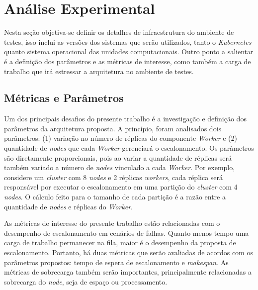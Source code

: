 \chapter{Análise Experimental}
Nesta seção objetiva-se definir os detalhes de infraestrutura do ambiente de testes, isso inclui as versões dos sistemas que serão utilizados, tanto o \textit{Kubernetes} quanto sistema operacional das unidades computacionais. Outro ponto a salientar é a definição dos parâmetros e as métricas de interesse, como também a carga de trabalho que irá estressar a arquitetura no ambiente de testes.

\section{Métricas e Parâmetros}
Um dos principais desafios do presente trabalho é a investigação e definição dos parâmetros da arquitetura proposta. A princípio, foram analisados dois parâmetros: (1) variação no número de réplicas do componente \textit{Worker} e (2) quantidade de \textit{nodes} que cada \textit{Worker} gerenciará o escalonamento. Os parâmetros são diretamente proporcionais, pois ao variar a quantidade de réplicas será também variado a número de \textit{nodes} vinculado a cada \textit{Worker}. Por exemplo, considere um \textit{cluster} com 8 \textit{nodes} e 2 réplicas \textit{workers}, cada réplica será responsável por executar o escalonamento em uma partição do \textit{cluster} com 4 \textit{nodes}. O cálculo feito para o tamanho de cada partição é a razão entre a quantidade de \textit{nodes} e réplicas do \textit{Worker}.


As métricas de interesse do presente trabalho estão relacionadas com o desempenho de escalonamento em cenários de falhas. Quanto menos tempo uma carga de trabalho permanecer na fila, maior é o desempenho da proposta de escalonamento. Portanto, há duas métricas que serão avaliadas de acordos com os parâmetros propostos: tempo de espera de escalonamento e \textit{makespan}. As métricas de sobrecarga também serão importantes, principalmente relacionadas a sobrecarga do \textit{node}, seja de espaço ou processamento.

